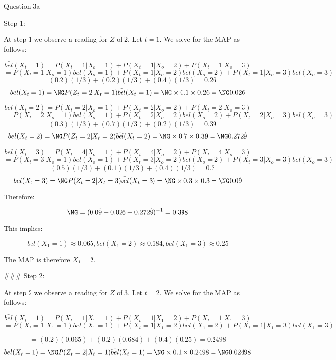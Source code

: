\b{Question 3a}

\b{Step 1:}

At step 1 we observe a reading for $Z$ of 2. Let $t = 1$. We solve for the MAP as follows:

$$ \bar{bel}(X_t = 1) = P(X_t = 1 | X_o = 1) + P(X_t = 1 | X_o = 2) + P(X_t = 1 | X_o = 3)$$
$$ = P(X_t = 1 | X_o = 1) bel(X_o = 1) + P(X_t = 1 | X_o = 2)  bel(X_o = 2) + P(X_t = 1 | X_o = 3)  bel(X_o = 3)$$
$$ = (0.2)(1/3)+(0.2)(1/3)+(0.4)(1/3) = 0.26 $$
$$ bel(X_t = 1) = Ŋ P(Z_t = 2 | X_t = 1) \bar{bel}(X_t = 1) = Ŋ \times 0.1 \times 0.26 = \NG 0.026 $$


$$ \bar{bel}(X_t = 2) = P(X_t = 2 | X_o = 1) + P(X_t = 2 | X_o = 2) + P(X_t = 2 | X_o = 3)$$
$$ = P(X_t = 2 | X_o = 1) bel(X_o = 1) + P(X_t = 2 | X_o = 2)  bel(X_o = 2) + P(X_t = 2 | X_o = 3)  bel(X_o = 3)$$
$$ = (0.3)(1/3)+(0.7)(1/3)+(0.2)(1/3) = 0.3\dot{9}$$
$$ bel(X_t = 2) = Ŋ P(Z_t = 2 | X_t = 2) \bar{bel}(X_t = 2) = Ŋ \times 0.7 \times 0.39 = \NG 0.272\dot{9} $$


$$ \bar{bel}(X_t = 3) = P(X_t = 4 | X_o = 1) + P(X_t = 4 | X_o = 2) + P(X_t = 4 | X_o = 3)$$
$$ = P(X_t = 3| X_o = 1) bel(X_o = 1) + P(X_t = 3 | X_o = 2)  bel(X_o = 2) + P(X_t = 3 | X_o = 3)  bel(X_o = 3)$$
$$ = (0.5)(1/3)+(0.1)(1/3)+(0.4)(1/3) = 0.\dot{3}$$
$$ bel(X_t = 3) = Ŋ P(Z_t = 2 | X_t = 3) \bar{bel}(X_t = 3) = Ŋ \times 0.3 \times 0.3 = \NG 0.0\dot{9} $$

Therefore:

$$ \NG = (0.0\dot{9} + 0.026 + 0.272\dot{9} ) ^{-1} = 0.398 $$

This implies:

$$ bel(X_1 = 1) \approx 0.065, bel(X_1 = 2) \approx 0.684, bel(X_1 = 3) \approx 0.25 $$

The MAP is therefore $X_1 = 2$.

### Step 2:

At step 2 we observe a reading for $Z$ of 3. Let $t = 2$. We solve for the MAP as follows:

\begin{equation} \bar{bel}(X_t = 1) = P(X_t = 1 | X_1 = 1) + P(X_t = 1 | X_1 = 2) + P(X_t = 1 | X_1 = 3) \end{equation}
$$ = P(X_t = 1 | X_1 = 1) bel(X_1 = 1) + P(X_t = 1 | X_1 = 2)  bel(X_1 = 2) + P(X_t = 1 | X_1 = 3)  bel(X_1 = 3)$$

$$ = (0.2)(0.065)+(0.2)(0.684)+(0.4)(0.25) = 0.2498 $$
$$ bel(X_t = 1) = Ŋ P(Z_t = 2 | X_t = 1) \bar{bel}(X_t = 1) = Ŋ \times 0.1 \times 0.2498 = \NG 0.02498 $$

